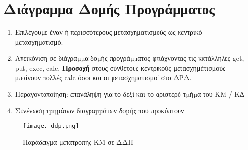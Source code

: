 \section{Διάγραμμα Δομής Προγράμματος}

\begin{enumerate}
	\item	Επιλέγουμε έναν ή περισσότερους μετασχηματισμούς ως κεντρικό μετασχηματισμό.
	\item	Απεικόνιση σε διάγραµµα δοµής προγράµµατος φτιάχνοντας τις κατάλληλες get, put, exec, calc.
		\textbf{Προσοχή} στους σύνθετους κεντρικούς μετασχημάτισμούς μπαίνουν πολλές calc όσοι και
		οι μετασχηματισμοί στο ΔΡΔ.
	\item	Παραγοντοποίηση: επανάληψη για το δεξί και το αριστερό τµήµα του ΚΜ / Κ∆
	\item	Συνένωση τµηµάτων διαγραµµάτων δοµής που προκύπτουν
\end{enumerate}

\begin{figure}[Η]
	\centering
	\texttt{[image: ddp.png]}
	\caption{Παράδειγμα μετατροπής ΚΜ σε ΔΔΠ}
\end{figure}
